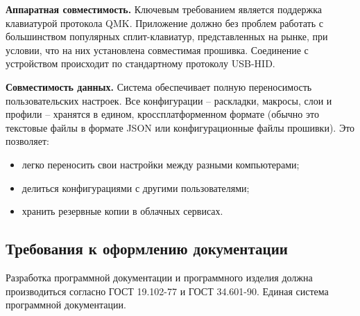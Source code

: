\textbf{Аппаратная совместимость.} Ключевым требованием является поддержка клавиатурой протокола QMK. Приложение должно без проблем работать с большинством популярных сплит-клавиатур, представленных на рынке, при условии, что на них установлена совместимая прошивка. Соединение с устройством происходит по стандартному протоколу USB-HID.

\textbf{Совместимость данных.} Система обеспечивает полную переносимость пользовательских настроек. Все конфигурации -- раскладки, макросы, слои и профили -- хранятся в едином, кроссплатформенном формате (обычно это текстовые файлы в формате JSON или конфигурационные файлы прошивки). Это позволяет:

\begin{itemize}
\item легко переносить свои настройки между разными компьютерами;
\item делиться конфигурациями с другими пользователями;
\item хранить резервные копии в облачных сервисах.
\end{itemize}

\subsection{Требования к оформлению документации}

Разработка программной документации и программного изделия должна производиться согласно ГОСТ 19.102-77 и ГОСТ 34.601-90. Единая система программной документации.
